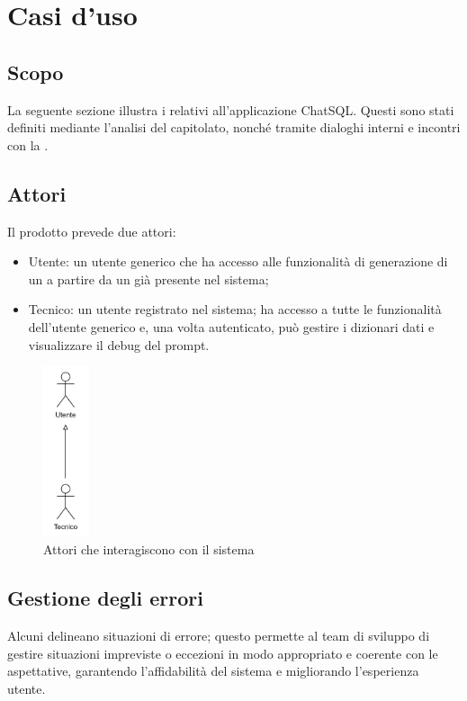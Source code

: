 \section{Casi d'uso}

\subsection{Scopo}
\par La seguente sezione illustra i  relativi all'applicazione ChatSQL. Questi sono stati definiti mediante l'analisi del capitolato, nonché tramite dialoghi interni e incontri con la .

\subsection{Attori}
\par Il prodotto prevede due attori:
\begin{itemize}
  \item Utente: un utente generico che ha accesso alle funzionalità di generazione di un  a partire da un  già presente nel sistema; 
  \item Tecnico: un utente registrato nel sistema; ha accesso a tutte le funzionalità dell'utente generico e, una volta autenticato, può gestire i dizionari dati e visualizzare il debug del prompt.
\end{itemize}

\begin{figure}[H]
  \centering
  \includegraphics[width=0.12\textwidth, height=0.27\textheight]{assets/attori.png}
  \caption{Attori che interagiscono con il sistema}
\end{figure}

\subsection{Gestione degli errori}
\par Alcuni  delineano situazioni di errore; questo permette al team di sviluppo di gestire situazioni impreviste o eccezioni in modo appropriato e coerente con le aspettative, garantendo l'affidabilità del sistema e migliorando l'esperienza utente.

